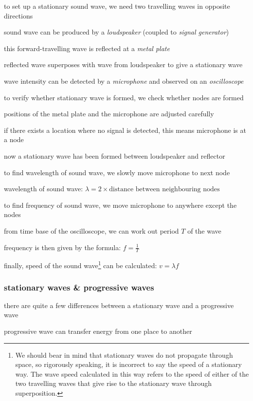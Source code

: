 \cmt to set up a stationary sound wave, we need two travelling waves in opposite directions

sound wave can be produced by a \emph{loudspeaker} (coupled to \emph{signal generator})

this forward-travelling wave is reflected at a \emph{metal plate}

reflected wave superposes with wave from loudspeaker to give a stationary wave

wave intensity can be detected by a \emph{microphone} and observed on an \emph{oscilloscope}

\cmt to verify whether stationary wave is formed, we check whether nodes are formed

positions of the metal plate and the microphone are adjusted carefully

if there exists a location where no signal is detected, this means microphone is at a node

now a stationary wave has been formed between loudspeaker and reflector

\cmt to find wavelength of sound wave, we slowly move microphone to next node

wavelength of sound wave: $\lambda = 2\times \text{distance between neighbouring nodes}$

\cmt to find frequency of sound wave, we move microphone to anywhere except the nodes

from time base of the oscilloscope, we can work out period $T$ of the wave

frequency is then given by the formula: $f=\frac{1}{T}$

\cmt finally,  speed of the sound wave\footnote{We should bear in mind that stationary waves do not propagate through space, so rigorously speaking, it is incorrect to say the speed of a stationary way. The wave speed calculated in this way refers to the speed of either of the two travelling waves that give rise to the stationary wave through superposition.} can be calculated: $v=\lambda f$




\subsubsection{stationary waves \& progressive waves}

there are quite a few differences between a stationary wave and a progressive wave

\cmt progressive wave can transfer energy from one place to another


